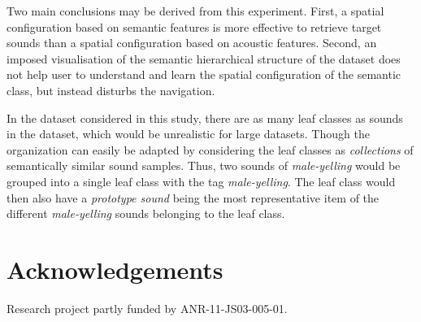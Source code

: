 \documentclass{aes2e}
\begin{document}
Two main conclusions may be derived from this experiment. First, a spatial configuration based on semantic features is more effective to retrieve target sounds than a spatial configuration based on acoustic features. Second, an imposed visualisation of the semantic hierarchical structure of the dataset does not help user to understand and learn the spatial configuration of the semantic class, but instead disturbs the navigation. 

In the dataset considered in this study, there are as many leaf classes as sounds in the dataset, which would be unrealistic for large datasets. Though the organization can easily be adapted by considering the leaf classes as \textit{collections} of semantically similar sound samples. Thus, two sounds of \textit{male-yelling} would be grouped into a  single leaf class with the tag \textit{male-yelling}. The leaf class would then also have a \textit{prototype sound} being the most representative item of the different \textit{male-yelling} sounds belonging to the leaf class.

%


\section{Acknowledgements}

Research project partly funded by ANR-11-JS03-005-01.



%
%
\end{document}
